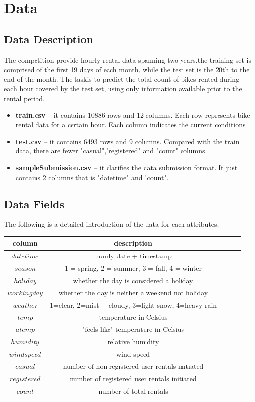 \documentclass{amsart}
\begin{document}
\section{Data} \label{sec-preliminaries}
\subsection{Data Description}
The competition provide hourly rental data spanning two years.the training set is comprised of the first 19 days of each month, while the test set is the 20th to the end of the month. The taskis to predict the total count of bikes rented during each hour covered by the test set, using only information available prior to the rental period.\\

\begin{itemize}
	\smallskip
	\item \textbf{train.csv} -- it contains 10886 rows and 12 columns. Each row represents bike rental data for a certain hour. Each column indicates the current conditions
	\smallskip
	\item \textbf{test.csv} -- it contains 6493 rows and 9 columns. Compared with the train data, there are fewer "casual","registered" and "count" columns.
	\smallskip
	\item \textbf{sampleSubmission.csv} -- it clarifies the data submission format. It just contains 2 columns that is "datetime" and "count".
\end{itemize}

\subsection{Data Fields}
The following is a detailed introduction of the data for each attributes.\\
\begin{tabular}{c| c c c c }
	\toprule
	\textbf{column} & \textbf{description}  \\
	\midrule
	$datetime$ &  {hourly date + timestamp }\\
	$season$ &  {1 = spring, 2 = summer, 3 = fall, 4 = winter} \\
	$holiday$ &  {whether the day is considered a holiday} \\
	$workingday$ &  {whether the day is neither a weekend nor holiday} \\
	$weather$ &  {1=clear, 2=mist + cloudy, 3=light snow, 4=heavy rain} \\
	$temp$ & {temperature in Celsius} \\
	$atemp$ & {"feels like" temperature in Celsius} \\
	$humidity$ & {relative humidity} \\
	$windspeed$ & {wind speed} \\
	$casual$ & {number of non-registered user rentals initiated} \\
	$registered$ & {number of registered user rentals initiated} \\
	$count$ & {number of total rentals} \\
	\bottomrule
\end{tabular}
\end{document}
